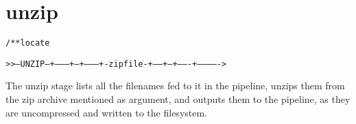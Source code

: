 \section{unzip}
\begin{shaded}
\begin{alltt}
/** locate



   >>--UNZIP--+---------+--+--------+-zipfile-+-----+--+-------+------------->
               

\end{alltt}
\end{shaded}
The unzip stage lists all the filenames fed to it in the pipeline,
unzips them from  the zip archive
mentioned as argument, and outputs them to the pipeline, as they are
uncompressed and written to the filesystem.